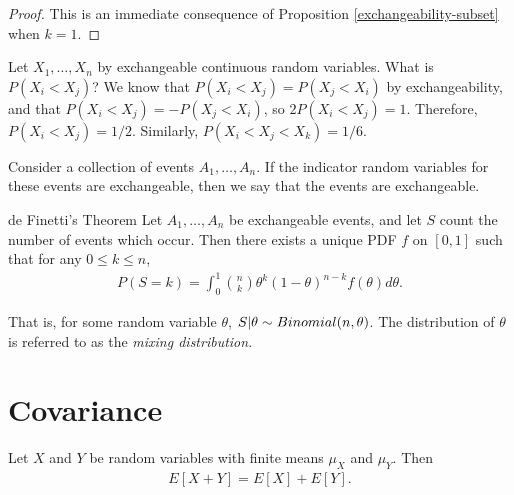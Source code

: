\begin{proof}
    This is an immediate consequence of Proposition \ref{exchangeability-subset} when $k = 1$.
\end{proof}

\begin{exmp}
    Let $X_1, \ldots, X_n$ by exchangeable continuous random variables. What is $P(X_i < X_j)$? We know that $P(X_i < X_j) = P(X_j < X_i)$ by exchangeability, and that $P(X_i < X_j) =  - P(X_j < X_i)$, so $2P(X_i < X_j) = 1$. Therefore, $P(X_i < X_j) = 1/2$. Similarly, $P(X_i < X_j < X_k) = 1/6$.
\end{exmp}

\begin{defn}
    Consider a collection of events $A_1, \ldots, A_n$. If the indicator random variables for these events are exchangeable, then we say that the events are exchangeable.
\end{defn}

\begin{thm}{de Finetti's Theorem}\label{de-finetti}\proofbreak
    Let $A_1, \ldots, A_n$ be exchangeable events, and let $S$ count the number of events which occur. Then there exists a unique PDF $f$ on $[0, 1]$ such that for any $0 \leq k \leq n$,
    \begin{align*}
        P(S = k) = \int_{0}^{1}\binom{n}{k}\theta^{k}(1-\theta)^{n-k}f(\theta)d\theta.
    \end{align*}

    That is, for some random variable $\theta$, $S | \theta \sim Binomial(n, \theta)$. The distribution of $\theta$ is referred to as the \emph{mixing distribution}.
\end{thm}

\section{Covariance}

\begin{prop}
    Let $X$ and $Y$ be random variables with finite means $\mu_X$ and $\mu_Y$. Then
    \begin{align*}
        E[X + Y] = E[X] + E[Y].
    \end{align*}
\end{prop}

